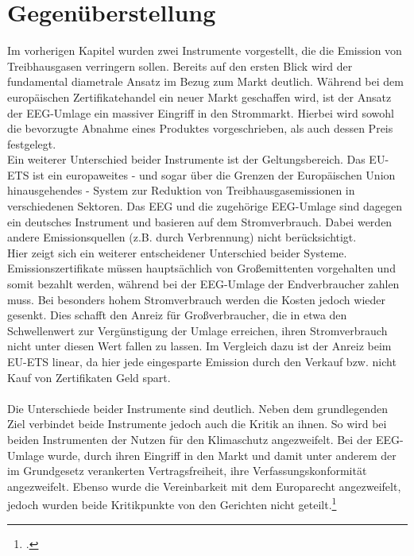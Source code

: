 \chapter{Gegenüberstellung}
Im vorherigen Kapitel wurden zwei Instrumente vorgestellt, die die Emission von Treibhausgasen verringern sollen.
Bereits auf den ersten Blick wird der fundamental diametrale Ansatz im Bezug zum Markt deutlich.
Während bei dem europäischen Zertifikatehandel ein neuer Markt geschaffen wird, ist der Ansatz der EEG-Umlage ein massiver Eingriff in den Strommarkt.
Hierbei wird sowohl die bevorzugte Abnahme eines Produktes vorgeschrieben, als auch dessen Preis festgelegt.\\
Ein weiterer Unterschied beider Instrumente ist der Geltungsbereich. Das EU-ETS ist ein europaweites - und sogar über die Grenzen der Europäischen Union hinausgehendes - System zur Reduktion von Treibhausgasemissionen in verschiedenen Sektoren. 
Das EEG und die zugehörige EEG-Umlage sind dagegen ein deutsches Instrument und basieren auf dem Stromverbrauch.
Dabei werden andere Emissionsquellen (z.B. durch Verbrennung) nicht berücksichtigt.\\
Hier zeigt sich ein weiterer entscheidener Unterschied beider Systeme.
Emissionszertifikate müssen hauptsächlich von Großemittenten vorgehalten und somit bezahlt werden, während bei der EEG-Umlage der Endverbraucher zahlen muss. Bei besonders hohem Stromverbrauch werden die Kosten jedoch wieder gesenkt.
Dies schafft den Anreiz für Großverbraucher, die in etwa den Schwellenwert zur Vergünstigung der Umlage erreichen, ihren Stromverbrauch nicht unter diesen Wert fallen zu lassen.
Im Vergleich dazu ist der Anreiz beim EU-ETS linear, da hier jede eingesparte Emission durch den Verkauf bzw. nicht Kauf von Zertifikaten Geld spart.\\\\
Die Unterschiede beider Instrumente sind deutlich. 
Neben dem grundlegenden Ziel verbindet beide Instrumente jedoch auch die Kritik an ihnen.
So wird bei beiden Instrumenten der Nutzen für den Klimaschutz angezweifelt.
Bei der EEG-Umlage wurde, durch ihren Eingriff in den Markt und damit unter anderem der im Grundgesetz verankerten Vertragsfreiheit, ihre Verfassungskonformität angezweifelt. Ebenso wurde die Vereinbarkeit mit dem Europarecht angezweifelt, jedoch wurden beide Kritikpunkte von den Gerichten nicht geteilt.\footcite[Vgl.][]{Bundesverfassungsgericht2016}
